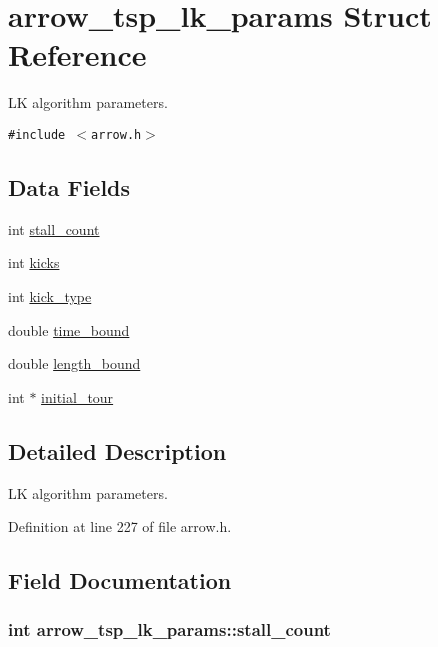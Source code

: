\hypertarget{structarrow__tsp__lk__params}{
\section{arrow\_\-tsp\_\-lk\_\-params Struct Reference}
\label{structarrow__tsp__lk__params}
}
LK algorithm parameters.  


{\tt \#include $<$arrow.h$>$}

\subsection*{Data Fields}
\begin{CompactItemize}
\item 
int \hyperlink{structarrow__tsp__lk__params_ec5d500e1f1d7dabbbe0d1aae2abfcf8}{stall\_\-count}
\item 
int \hyperlink{structarrow__tsp__lk__params_9744a2fb89bca6b678fec9a6a17255ea}{kicks}
\item 
int \hyperlink{structarrow__tsp__lk__params_5b724dc268faa478b5b3e14c19abdc2a}{kick\_\-type}
\item 
double \hyperlink{structarrow__tsp__lk__params_22355808165edb6033ca771b88917cf5}{time\_\-bound}
\item 
double \hyperlink{structarrow__tsp__lk__params_36fb446a90e9b4c76702bd93f00357ea}{length\_\-bound}
\item 
int $\ast$ \hyperlink{structarrow__tsp__lk__params_1684519ac0bb6e529707b59f6cd7d528}{initial\_\-tour}
\end{CompactItemize}


\subsection{Detailed Description}
LK algorithm parameters. 

Definition at line 227 of file arrow.h.

\subsection{Field Documentation}
\hypertarget{structarrow__tsp__lk__params_ec5d500e1f1d7dabbbe0d1aae2abfcf8}{
\subsubsection{\setlength{\rightskip}{0pt plus 5cm}int {\bf arrow\_\-tsp\_\-lk\_\-params::stall\_\-count}}}
\label{structarrow__tsp__lk__params_ec5d500e1f1d7dabbbe0d1aae2abfcf8}


